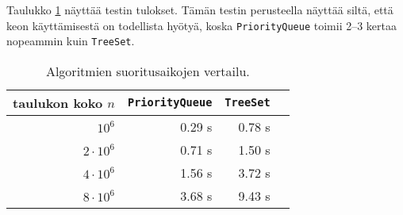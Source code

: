 Taulukko \ref{tab:kekver} näyttää testin tulokset.
Tämän testin perusteella näyttää siltä,
että keon käyttämisestä on todellista hyötyä,
koska \texttt{PriorityQueue} toimii 2–3
kertaa nopeammin kuin \texttt{TreeSet}.

\begin{table}
\center
\begin{tabular}{rrrr}
taulukon koko $n$ & \texttt{PriorityQueue} & \texttt{TreeSet} \\
\hline
$10^6$ & 0.29 s & 0.78 s \\
$2 \cdot 10^6$ & 0.71 s & 1.50 s \\
$4 \cdot 10^6$ & 1.56 s & 3.72 s \\
$8 \cdot 10^6$ & 3.68 s & 9.43 s \\
\end{tabular}
\caption{Algoritmien suoritusaikojen vertailu.}
\label{tab:kekver}
\end{table}
